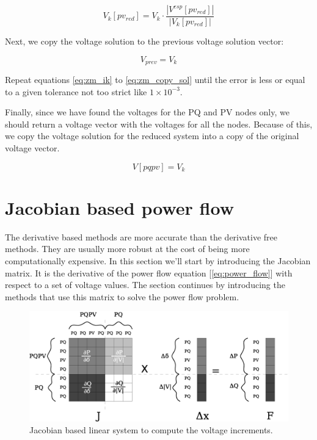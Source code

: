 \documentclass[nols,a4paper,twoside,notoc,fleqn]{tufte-book}
\begin{document}
\begin{equation}
V_{k}[pv_{red}] = V_k \cdot \frac{|V^{esp}[pv_{red}]|}{|V_{k}[pv_{red}]|}
\label{eq:zm_pv_correction}
\end{equation}


Next, we copy the voltage solution to the previous voltage solution vector:

\begin{equation}
V_{prev} = V_k
\label{eq:zm_copy_sol}
\end{equation}

Repeat equations \ref{eq:zm_ik} to \ref{eq:zm_copy_sol} until the error is less or equal to a given tolerance not too strict like $1\times10^{-3}$.

Finally, since we have found the voltages for the PQ and PV nodes only, we should return a voltage vector with the voltages for all the nodes. Because of this, we copy the voltage solution for the reduced system into a copy of the original voltage vector.

\begin{equation}
V[pqpv] = V_k
\end{equation}


\section{Jacobian based power flow}

The derivative based methods are more accurate than the derivative free methods. They are usually more robust at the cost of being more computationally expensive. In this section we'll start by introducing the Jacobian matrix. It is the derivative of the power flow equation  [\ref{eq:power_flow}] with respect to a set of voltage values. The section continues by introducing the methods that use this matrix to solve the power flow problem.

\begin{center}
\begin{figure}[h!]
  \includegraphics[width=0.9\linewidth]{img/JacobianBased.eps}
  \caption{Jacobian based linear system to compute the voltage increments.}
  \label{fig:jacobian_based}
\end{figure}
\end{center}
\end{document}
